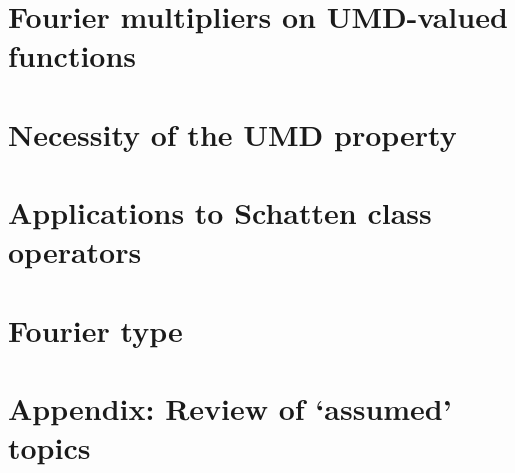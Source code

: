 \documentclass[a4paper,10pt]{amsbook}
\begin{document}
\chapter{Fourier multipliers on UMD-valued functions}
\label{sec:Fourier-multipliers}


\chapter{Necessity of the UMD property}
\label{sec:UMD-necessity}


\chapter{Applications to Schatten class operators}
\label{sec:schatten}


\chapter{Fourier type}
\label{sec:fouriertype}


\chapter{Appendix: Review of `assumed' topics}
\label{sec:appendices}






 

\printindex
\end{document}
